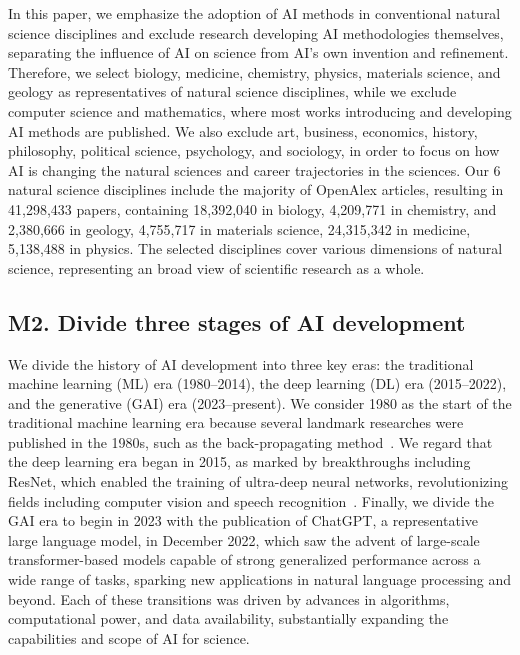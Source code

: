 In this paper, we emphasize the adoption of AI methods in conventional natural science disciplines and exclude research developing AI methodologies themselves, separating the influence of AI on science from AI’s own invention and refinement.
Therefore, we select biology, medicine, chemistry, physics, materials science, and geology as representatives of natural science disciplines, while we exclude computer science and mathematics, where most works introducing and developing AI methods are published.
We also exclude art, business, economics, history, philosophy, political science, psychology, and sociology, in order to focus on how AI is changing the natural sciences and career trajectories in the sciences.
Our 6 natural science disciplines include the majority of OpenAlex articles, resulting in 41,298,433 papers, containing 18,392,040 in biology, 4,209,771 in chemistry, and 2,380,666 in geology, 4,755,717 in materials science, 24,315,342 in medicine, 5,138,488 in physics.
The selected disciplines cover various dimensions of natural science, representing an broad view of scientific research as a whole.

\subsection*{M2. Divide three stages of AI development}
We divide the history of AI development into three key eras: the traditional machine learning (ML) era (1980–2014), the deep learning (DL) era (2015–2022), and the generative (GAI) era (2023–present).
We consider 1980 as the start of the traditional machine learning era because several landmark researches were published in the 1980s, such as the back-propagating method~\supercite{rumelhart1986learning,lecun1989backpropagation}.
We regard that the deep learning era began in 2015, as marked by breakthroughs including ResNet, which enabled the training of ultra-deep neural networks, revolutionizing fields including computer vision and speech recognition~\supercite{he2016deep}.
Finally, we divide the GAI era to begin in 2023 with the publication of ChatGPT, a representative large language model, in December 2022, which saw the advent of large-scale transformer-based models capable of strong generalized performance across a wide range of tasks, sparking new applications in natural language processing and beyond.
Each of these transitions was driven by advances in algorithms, computational power, and data availability, substantially expanding the capabilities and scope of AI for science.

